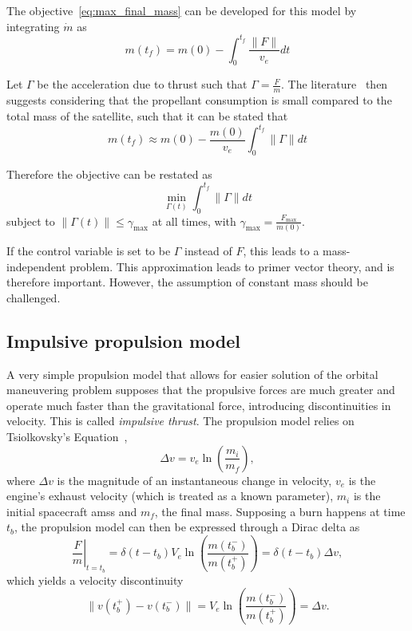 The objective~\eqref{eq:max_final_mass} can be developed for this model by integrating \(\dot{m}\) as
\begin{equation}
    m(t_f) = m(0) - \int_0^{t_f} \frac{\lVert F \rVert}{v_e} dt
\end{equation}

Let \(\Gamma\) be the acceleration due to thrust such that \(\Gamma = \frac{F}{m}\). The literature~\cite{Conway_2010} then suggests considering that the propellant consumption is small compared to the total mass of the satellite, such that it can be stated that
\begin{equation}
    m(t_f) \approx m(0) - \frac{m(0)}{v_e}\int_0^{t_f} \lVert \Gamma \rVert dt
\end{equation}

Therefore the objective can be restated as
\begin{equation}\label{eq:obj_continuous_thrust}
    \min_{\Gamma(t)} \int_0^{t_f} \lVert \Gamma \rVert dt
\end{equation}
subject to \(\lVert \Gamma(t) \rVert \leq \gamma_{\max}\) at all times, with \(\gamma_{\max} = \frac{F_{\max}}{m(0)}\).

If the control variable is set to be \(\Gamma\) instead of \(F\), this leads to a mass-independent problem. This approximation leads to primer vector theory, and is therefore important. However, the assumption of constant mass should be challenged.


\subsection{Impulsive propulsion model}


A very simple propulsion model that allows for easier solution of the orbital maneuvering problem supposes that the propulsive forces are much greater and operate much faster than the gravitational force, introducing discontinuities in velocity. This is called \textit{impulsive thrust}. The propulsion model relies on Tsiolkovsky's Equation~\cite{Conway_2010}, 
\begin{equation}
    \Delta v = v_e \ln{\left(\frac{m_i}{m_f}\right)},
\end{equation}
where \(\Delta v\) is the magnitude of an instantaneous change in velocity, \(v_e\) is the engine's exhaust velocity (which is treated as a known parameter), \(m_i\) is the initial spacecraft amss and \(m_f\), the final mass. Supposing a burn happens at time \(t_b\), the propulsion model can then be expressed through a Dirac delta as
\begin{equation}
    \left.\frac{F}{m}\right\vert_{t = t_b} = \delta(t - t_b) V_e \ln{\left(\frac{m(t_b^-)}{m(t_b^+)} \right)} = \delta(t - t_b) \Delta v,
\end{equation}
which yields a velocity discontinuity
\begin{equation}
    \lVert v(t_b^+) - v(t_b^-) \rVert = V_e \ln{\left(\frac{m(t_b^-)}{m(t_b^+)}\right)} = \Delta v.
\end{equation}

